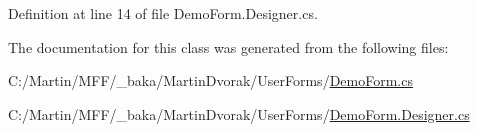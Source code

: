 Definition at line 14 of file Demo\+Form.\+Designer.\+cs.



The documentation for this class was generated from the following files\+:\begin{DoxyCompactItemize}
\item 
C\+:/\+Martin/\+M\+F\+F/\+\_\+baka/\+Martin\+Dvorak/\+User\+Forms/\hyperlink{_demo_form_8cs}{Demo\+Form.\+cs}\item 
C\+:/\+Martin/\+M\+F\+F/\+\_\+baka/\+Martin\+Dvorak/\+User\+Forms/\hyperlink{_demo_form_8_designer_8cs}{Demo\+Form.\+Designer.\+cs}\end{DoxyCompactItemize}
